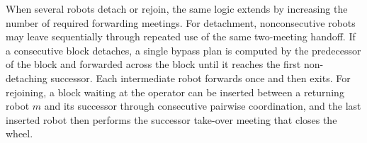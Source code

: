 When several robots detach or rejoin, the same logic extends by increasing the
number of required forwarding meetings. For detachment, nonconsecutive robots
may leave sequentially through repeated use of the same two-meeting handoff. If
a consecutive block detaches, a single bypass plan is computed by the
predecessor of the block and forwarded across the block until it reaches the
first non-detaching successor. Each intermediate robot forwards once and then
exits. For rejoining, a block waiting at the operator can be inserted between a
returning robot $m$ and its successor through consecutive pairwise coordination,
and the last inserted robot then performs the successor take-over meeting that
closes the wheel.
